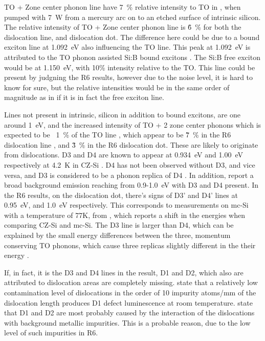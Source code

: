 TO + Zone center phonon line have 7~\% relative intensity to TO in \cite{dean67}, when pumped with 7~W from a mercury arc on to an etched surface of intrinsic silicon. The relative intensity of TO + Zone center phonon line is \~6~\% for both the dislocation line, and dislocation dot. The difference here could be due to a bound exciton line at 1.092~eV also influencing the TO line. This peak at 1.092~eV is attributed to the TO phonon assisted Si:B bound excitons \cite{sauer73}. The Si:B free exciton would be at 1.150~eV, with 10\% intensity relative to the TO. This line could be present by judgning the R6 results, however due to the noise level, it is hard to know for sure, but the relative intensities would be in the same order of magnitude as in \cite{sauer73} if it is in fact the free exciton line.


Lines not present in intrinsic, silicon in addition to bound excitons, are one around 1~eV, and the increased intensity of TO + 2 zone center phonons which is expected to be ~1~\% of the TO line \cite{dean67}, which appear to be \~7~\% in the R6 dislocation line , and \~3~\% in the R6 dislocation dot. These are likely to originate from dislocations. D3 and D4 are known to appear at 0.934~eV and 1.00~eV respectively at 4.2~K in CZ-Si \cite{drozdov76}. D4 has not been observed without D3, and vice versa, and D3 is considered to be a phonon replica of D4 \cite{kveder95}. In addition, \cite{tajima95} report a broad background emission reaching from 0.9-1.0~eV with D3 and D4 present. In the R6 results, on the dislocation dot, there's signs of D3' and D4' lines at 0.95~eV, and 1.0~eV respectively. This corresponds to measurements on mc-Si with a temperature of 77K, from \cite{tarasov00}, which reports a shift in the energies when comparing CZ-Si and mc-Si. The D3 line is larger than D4, which can be explained by the small energy differences between the three, momentum conserving TO phonons, which cause three replicas slightly different in the their energy \cite{arguirov07}.

If, in fact, it is the D3 and D4 lines in the result, D1 and D2, which also are attributed to dislocation areas are completely missing. \cite{kitler02} state that a relatively low contamination level of dislocations in the order of 10 impurity atoms/mm of the dislocation length produces D1 defect luminescence at room temperature. \cite{arguirov07} state that D1 and D2 are most probably caused by the interaction of the dislocations with background metallic impurities. This is a probable reason, due to the low level of such impurities in R6.



